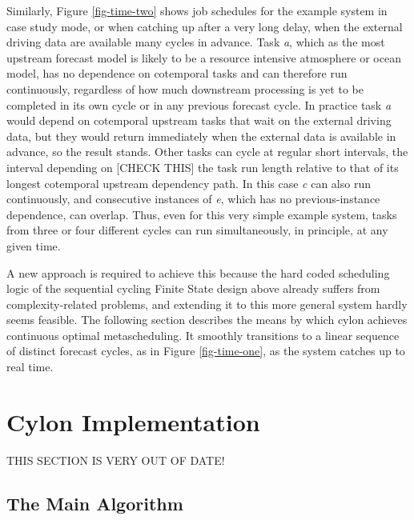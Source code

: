 \documentclass[11pt,a4paper]{article}
\begin{document}
Similarly, Figure \ref{fig-time-two} shows job schedules for the example
system in case study mode, or when catching up after a very long delay,
when the external driving data are available many cycles in advance.
Task {\em a}, which as the most upstream forecast model is likely to be
a resource intensive atmosphere or ocean model, has no dependence on
cotemporal tasks and can therefore run continuously, regardless of how
much downstream processing is yet to be completed in its own cycle or in
any previous forecast cycle. In practice task {\em a} would depend on
cotemporal upstream tasks that wait on the external driving data, but
they would return immediately when the external data is available in
advance, so the result stands. Other tasks can cycle at regular short
intervals, the interval depending on [CHECK THIS] the task run length
relative to that of its longest cotemporal upstream dependency path. In
this case {\em c} can also run continuously, and consecutive instances
of {\em e}, which has no previous-instance dependence, can overlap.
Thus, even for this very simple example system, tasks from three or four
different cycles can run simultaneously, in principle, at any given
time. 

A new approach is required to achieve this because the hard coded
scheduling logic of the sequential cycling Finite State design above
already suffers from complexity-related problems, and extending it to
this more general system hardly seems feasible. The following section
describes the means by which cylon achieves continuous optimal
metascheduling. It smoothly transitions to a linear sequence of distinct
forecast cycles, as in Figure \ref{fig-time-one}, as the system catches
up to real time.  


\section{Cylon Implementation}

{\huge THIS SECTION IS VERY OUT OF DATE!}

\subsection{The Main Algorithm}
\end{document}
